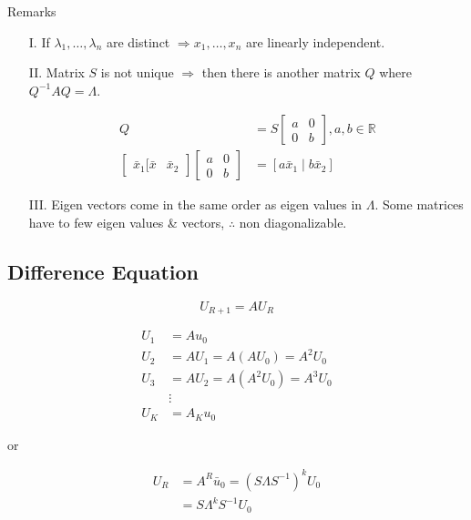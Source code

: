 \documentclass[main.tex]{subfiles}
\begin{document}
    Remarks

    \begin{enumerate}
        \item [I.] If $\lambda_{1}, \ldots, \lambda_{n}$ are distinct $\Rightarrow x_{1}, \ldots, x_{n}$ are linearly independent.
        \item [II.] Matrix $S$ is not unique $\Rightarrow$ then there is another matrix $Q$ where $Q^{-1} A Q= \Lambda$. 
        
        $$
        \begin{aligned}
        Q&=S\left[\begin{array}{ll}a & 0 \\ 0 & b\end{array}\right], a, b \in \mathbb{R}\\
        \left[\begin{array}{ll}
        \bar{x}_{1}[\bar{x} & \bar{x}_{2}
        \end{array}\right]\left[\begin{array}{ll}
        a & 0 \\
        0 & b
        \end{array}\right] &= \left[a \bar{x}_{1} \mid b \bar{x}_{2}\right]
        \end{aligned}
        $$
        
        \item[III.] Eigen vectors come in the same order as eigen values in $\Lambda$. Some matrices have to few eigen values \& vectors, $\therefore$ non diagonalizable.
    \end{enumerate}
    
\subsection{Difference Equation}

    $$
    U_{R+1}=A U_{R}
    $$

    $$
    \begin{aligned}
    U_{1} &= A u_{0}\\
    U_{2} &= A U_{1} = A \left( A U_{0} \right) = A^{2} U_{0}\\
    U_{3} &=A U_{2} = A\left(A^{2} U_{0}\right) = A^{3} U_{0}\\
    & \vdots \\
    U_{K} & = A_{K} u_{0}
    \end{aligned}
    $$

    or

    $$
    \begin{aligned}
    U_{R} &= A^{R} \bar{u}_{0} = ( S \Lambda S^{-1} )^{k} U_{0} \\
    & = S \Lambda^{k} S^{-1} U_{0}
    \end{aligned}
    $$
\end{document}
